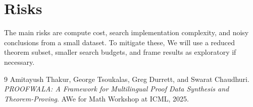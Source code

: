 \documentclass{article} %
\begin{document}
\section*{Risks}
The main risks are compute cost, search implementation complexity, and noisy conclusions from a small dataset. To mitigate these, We  will use a reduced theorem subset, smaller search budgets, and frame results as exploratory if necessary.

\vspace{4pt}
\begin{thebibliography}{9}
Amitayush Thakur, George Tsoukalas, Greg Durrett, and Swarat Chaudhuri.
\newblock \emph{PROOFWALA: A Framework for Multilingual Proof Data Synthesis and Theorem-Proving}.
\newblock AWe  for Math Workshop at ICML, 2025.
\end{thebibliography}
\end{document}
